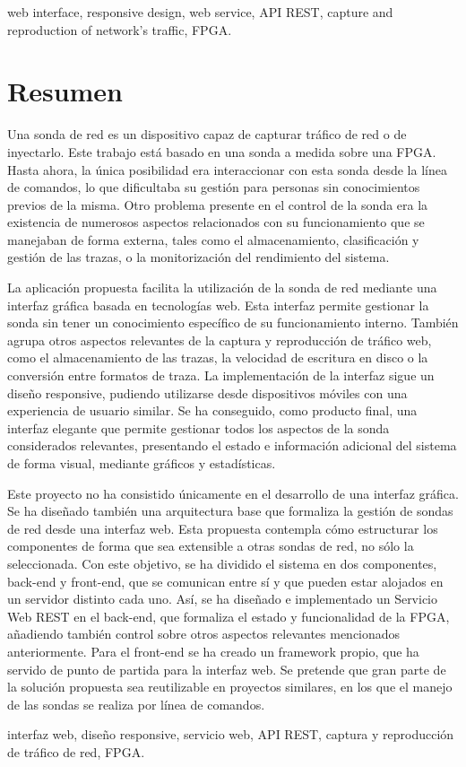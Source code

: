 \begin{keywordsEn}
web interface, responsive design, web service, API REST, capture and reproduction of network's traffic, FPGA.
\end{keywordsEn}

\chapter*{Resumen}

\begin{abstractEs}

Una sonda de red es un dispositivo capaz de capturar tráfico de red o de inyectarlo.
Este trabajo está basado en una sonda a medida sobre una FPGA.
Hasta ahora, la única posibilidad era interaccionar con esta sonda desde la línea de comandos, lo que dificultaba su gestión para personas sin conocimientos previos de la misma.
Otro problema presente en el control de la sonda era la existencia de numerosos aspectos relacionados con su funcionamiento que se manejaban de forma externa, tales como el almacenamiento, clasificación y gestión de las trazas, o la monitorización del rendimiento del sistema.

La aplicación propuesta facilita la utilización de la sonda de red mediante una interfaz gráfica basada en tecnologías web.
Esta interfaz permite gestionar la sonda sin tener un conocimiento específico de su funcionamiento interno.
También agrupa otros aspectos relevantes de la captura y reproducción de tráfico web, como el almacenamiento de las trazas, la velocidad de escritura en disco o la conversión entre formatos de traza.
La implementación de la interfaz sigue un diseño responsive, pudiendo utilizarse desde dispositivos móviles con una experiencia de usuario similar.
Se ha conseguido, como producto final, una interfaz elegante que permite gestionar todos los aspectos de la sonda considerados relevantes, presentando el estado e información adicional del sistema de forma visual, mediante gráficos y estadísticas.

Este proyecto no ha consistido únicamente en el desarrollo de una interfaz gráfica.
Se ha diseñado también una arquitectura base que formaliza la gestión de sondas de red desde una interfaz web.
Esta propuesta contempla cómo estructurar los componentes de forma que sea extensible a otras sondas de red, no sólo la seleccionada.
Con este objetivo, se ha dividido el sistema en dos componentes, back-end y front-end, que se comunican entre sí y que pueden estar alojados en un servidor distinto cada uno.
Así, se ha diseñado e implementado un Servicio Web REST en el back-end, que formaliza el estado y funcionalidad de la FPGA, añadiendo también control sobre otros aspectos relevantes mencionados anteriormente.
Para el front-end se ha creado un framework propio, que ha servido de punto de partida para la interfaz web.
Se pretende que gran parte de la solución propuesta sea reutilizable en proyectos similares, en los que el manejo de las sondas se realiza por línea de comandos.

\end{abstractEs}

\begin{keywordsEs}
interfaz web, diseño responsive, servicio web, API REST, captura y reproducción de tráfico de red, FPGA.
\end{keywordsEs}
